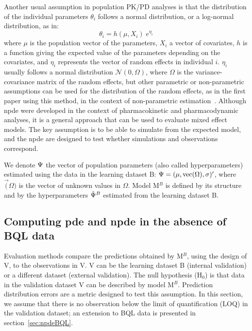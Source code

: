 Another usual assumption in population PK/PD analyses is that the distribution of the individual parameters $\theta_i$ follows a normal distribution, or a log-normal distribution, as in:
\begin{equation}
\theta_i=h(\mu, X_i) \; e^{\eta_i} \label{eq:modelPKcov}
\end{equation}
where $\mu$ is the population vector of the parameters, $X_i$ a vector of covariates, $h$ is a function giving the expected value of the parameters depending on the covariates, and $\eta_i$ represents the vector of random effects in individual $i$. $\eta_i$ usually follows a normal distribution $\mathcal{N} (0, \Omega)$, where $\Omega$ is the variance-covariance matrix of the random effects, but other parametric or non-parametric assumptions can be used for the distribution of the random effects, as in the first paper using this method, in the context of non-parametric estimation~\cite{Mesnil}. Although npde were developed in the context of pharmacokinetic and pharmacodynamic analyses, it is a general approach that can be used to evaluate mixed effect models. The key assumption is to be able to simulate from the expected model, and the npde are designed to test whether simulations and observations correspond.

We denote ${\rm \Psi}$ the vector of population parameters (also called hyperparameters) estimated using the data in the learning dataset B: ${\rm \Psi}= (\mu, \vec(\Omega),\sigma)'$, where $\vec(\Omega)$ is the vector of unknown values in $\Omega$. Model M$^B$ is defined by its structure and by the hyperparameters $\hat{\rm \Psi}^B$ estimated from the learning dataset B.

\subsection{Computing pde and npde in the absence of BQL data} \label{subsec:npdenoBQL}

\hskip 18pt Evaluation methods compare the predictions obtained by M$^B$, using the design of V, to the observations in V. V can be the learning dataset B (internal validation) or a different dataset (external validation). The null hypothesis (H$_0$) is that data in the validation dataset V can be described by model M$^B$. Prediction distribution errors are a metric designed to test this assumption. In this section, we assume that there is no observation below the limit of quantification (LOQ) in the validation dataset; an extension to BQL data is presented in section~\ref{sec:npdeBQL}.


